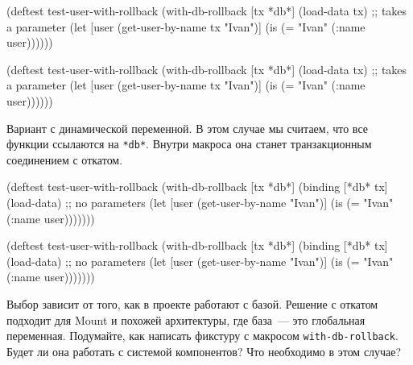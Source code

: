 \ifx\DEVICETYPE\MOBILE

\begin{english}
  \begin{clojure}
(deftest test-user-with-rollback
  (with-db-rollback [tx *db*]
    (load-data tx) ;; takes a parameter
    (let [user
          (get-user-by-name tx "Ivan")]
      (is (= "Ivan" (:name user))))))
  \end{clojure}
\end{english}

\else

\begin{english}
  \begin{clojure}
(deftest test-user-with-rollback
  (with-db-rollback [tx *db*]
    (load-data tx) ;; takes a parameter
    (let [user (get-user-by-name tx "Ivan")]
      (is (= "Ivan" (:name user))))))
  \end{clojure}
\end{english}

\fi


Вариант с динамической переменной. В этом случае мы считаем, что все функции
ссылаются на \verb|*db*|. Внутри макроса она станет транзакционным соединением
с откатом.

\ifx\DEVICETYPE\MOBILE

\begin{english}
  \begin{clojure}
(deftest test-user-with-rollback
  (with-db-rollback [tx *db*]
    (binding [*db* tx]
      (load-data) ;; no parameters
      (let [user
            (get-user-by-name "Ivan")]
        (is (= "Ivan" (:name user)))))))
  \end{clojure}
\end{english}

\else

\begin{english}
  \begin{clojure}
(deftest test-user-with-rollback
  (with-db-rollback [tx *db*]
    (binding [*db* tx]
      (load-data) ;; no parameters
      (let [user (get-user-by-name "Ivan")]
        (is (= "Ivan" (:name user)))))))
  \end{clojure}
\end{english}

\fi

Выбор зависит от того, как в проекте работают с базой. Решение с откатом
подходит для Mount и похожей архитектуры, где база~--- это глобальная
переменная. Подумайте, как написать фикстуру с макросом
\verb|with-db-rollback|. Будет ли она работать с системой компонентов? Что
необходимо в этом случае?

